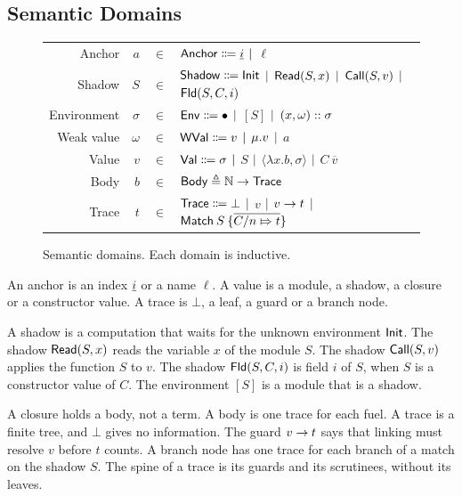 \subsection{Semantic Domains}

\begin{figure}[h]
  \small
  \centering
  \begin{tabular}{rrcl}
    Anchor      & $a$      & $\in$ & $\mathsf{Anchor}\Coloneqq\underline{i}$ $|$ $\ell$                                              \\
    Shadow      & $S$      & $\in$ & $\Event\Coloneqq\InitE$ $|$ $\ReadE(S,x)$ $|$ $\CallE(S,v)$ $|$ $\FldE(S,C,i)$ \\
    Environment & $\sigma$ & $\in$ & $\mathsf{Env}\Coloneqq\bullet$ $|$ $[S]$ $|$ $(x,\omega)::\sigma$                       \\
    Weak value  & $\omega$ & $\in$ & $\mathsf{WVal}\Coloneqq v$ $|$ $\mu.{v}$ $|$ $a$                                       \\
    Value       & $v$      & $\in$ & $\mathsf{Val}\Coloneqq\sigma$ $|$ $S$ $|$ $\langle\lambda x.b,\sigma\rangle$ $|$ $C\:\overline{v}$ \\
    Body        & $b$      & $\in$ & $\mathsf{Body}\triangleq\mathbb{N}\rightarrow\mathsf{Trace}$                                            \\
    Trace       & $t$      & $\in$ & $\mathsf{Trace}\Coloneqq\bot$ $|$ $v$ $|$ ${v}\rightarrow{t}$ $|$ $\mathsf{Match}\:S\:\{\overline{C/n\Mapsto t}\}$
  \end{tabular}
  \caption{Semantic domains. Each domain is inductive.}
  \label{fig:domains}
\end{figure}

An anchor is an index $\underline{i}$ or a name $\ell$.
A value is a module, a shadow, a closure or a constructor value.
A trace is $\bot$, a leaf, a guard or a branch node.

A shadow is a computation that waits for the unknown environment $\InitE$.
The shadow $\ReadE(S,x)$ reads the variable $x$ of the module $S$.
The shadow $\CallE(S,v)$ applies the function $S$ to $v$.
The shadow $\FldE(S,C,i)$ is field $i$ of $S$, when $S$ is a constructor value of $C$.
The environment $[S]$ is a module that is a shadow.

A closure holds a body, not a term.
A body is one trace for each fuel.
A trace is a finite tree, and $\bot$ gives no information.
The guard ${v}\rightarrow{t}$ says that linking must resolve $v$ before $t$ counts.
A branch node has one trace for each branch of a match on the shadow $S$.
The spine of a trace is its guards and its scrutinees, without its leaves.

